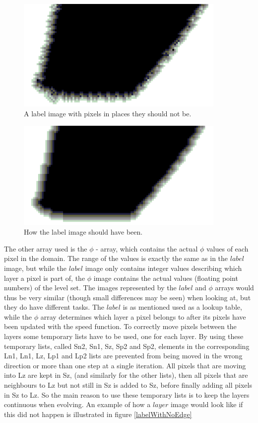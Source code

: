 \begin{figure}[h!]
\centering
\includegraphics[width=0.90\textwidth]{implemented/labelFailedEx}
\caption{A label image with pixels in places they should not be.}
\label{labelFailedEx}
\end{figure}

\begin{figure}[h!]
\centering
\includegraphics[width=0.90\textwidth]{implemented/labelOkEx}
\caption{How the label image should have been.}
\label{labelOkEx}
\end{figure}

The other array used is the $\phi$ - array, which contains the actual $\phi$ values of each pixel in the domain. The range of the values is exactly the same as in the $label$ image, but while the $label$ image only contains integer values describing which layer a pixel is part of, the $\phi$ image contains the actual values (floating point numbers) of the level set. The images represented by the $label$ and $\phi$ arrays would thus be very similar (though small differences may be seen) when looking at, but they do have different tasks. The $label$ is as mentioned used as a lookup table, while the $\phi$ array determines which layer a pixel belongs to after its pixels have been updated with the speed function.
To correctly move pixels between the layers some temporary lists have to be used, one for each layer. By using these temporary lists, called Sn2, Sn1, Sz, Sp2 and Sp2, elements in the corresponding Ln1, Ln1, Lz, Lp1 and Lp2 lists are prevented from being moved in the wrong direction or more than one step at a single iteration. All pixels that are moving into Lz are kept in Sz, (and similarly for the other lists), then all pixels that are neighbours to Lz but not still in Sz is added to Sz, before finally adding all pixels in Sz to Lz. So the main reason to use these temporary lists is to keep the layers continuous when evolving. An example of how a $layer$ image would look like if this did not happen is illustrated in figure \ref{labelWithNoEdge}

